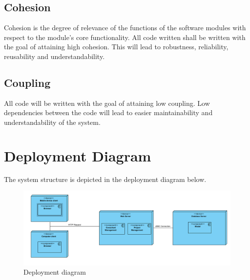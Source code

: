 \documentclass[a4paper, 12pt, oneside]{article}
\begin{document}
\subsection{Cohesion}
 Cohesion is the degree of relevance of the functions of the software modules with respect to the module’s core functionality.  All code written shall be written with the goal of attaining high cohesion. This will lead to robustness, reliability, reusability and understandability.
\subsection{Coupling}
All code will be written with the goal of attaining low coupling. Low dependencies between the code will lead to easier maintainability and understandability of the system.

\section{Deployment Diagram}
	The system structure is depicted in the deployment diagram below.
\newline
\begin{figure}[h!]
	\includegraphics[width=\linewidth]{images/deployment.png}
	\caption{Deployment diagram}
\end{figure}
\end{document}

